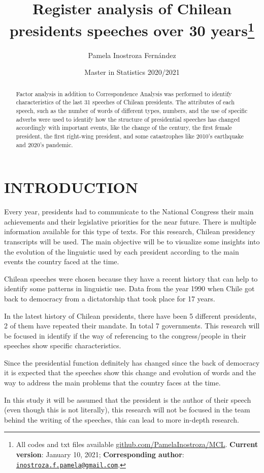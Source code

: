 \documentclass[
  12pt,
]{article}
\title{Register analysis of Chilean presidents speeches over 30 years\thanks{All codes and txt files available \href{https://github.com/PamelaInostroza/MCL}{github.com/PamelaInostroza/MCL}. \textbf{Current version}: January 10, 2021; \textbf{Corresponding author}: \href{mailto:inostroza.f.pamela@gmail.com}{\nolinkurl{inostroza.f.pamela@gmail.com}}.}}
\author{Pamela Inostroza Fernández}
\date{Master in Statistics 2020/2021}
\begin{document}
\maketitle
\begin{abstract}
Factor analysis in addition to Correspondence Analysis was performed to identify characteristics of the last 31 speeches of Chilean presidents. The attributes of each speech, such as the number of words of different types, numbers, and the use of specific adverbs were used to identify how the structure of presidential speeches has changed accordingly with important events, like the change of the century, the first female president, the first right-wing president, and some catastrophes like 2010's earthquake and 2020's pandemic.
\end{abstract}

\newpage

\hypertarget{introduction}{%
\section{INTRODUCTION}\label{introduction}}

Every year, presidents had to communicate to the National Congress their main achievements and their legislative priorities for the near future. There is multiple information available for this type of texts. For this research, Chilean presidency transcripts will be used. The main objective will be to visualize some insights into the evolution of the linguistic used by each president according to the main events the country faced at the time.

Chilean speeches were chosen because they have a recent history that can help to identify some patterns in linguistic use. Data from the year 1990 when Chile got back to democracy from a dictatorship that took place for 17 years.

In the latest history of Chilean presidents, there have been 5 different presidents, 2 of them have repeated their mandate. In total 7 governments. This research will be focused in identify if the way of referencing to the congress/people in their speeches show specific characteristics.

Since the presidential function definitely has changed since the back of democracy it is expected that the speeches show this change and evolution of words and the way to address the main problems that the country faces at the time.

In this study it will be assumed that the president is the author of their speech (even though this is not literally), this research will not be focused in the team behind the writing of the speeches, this can lead to more in-depth research.
\end{document}
